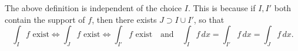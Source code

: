 \begin{remark}
  The above definition is independent of the choice $I$.
  This is because if $I, I'$ both contain the support
  of $f$, then there exists $J \supset I \cup I'$, so that
  \[
    \int_I f \text{ exist} \iff
    \int_J f \text{ exist} \iff
    \int_{I'} f \text{ exist}
    \quad \text{and} \quad
    \int_I f\, dx = \int_{I'} f\, dx = \int_J f\, dx.
  \]
\end{remark}
